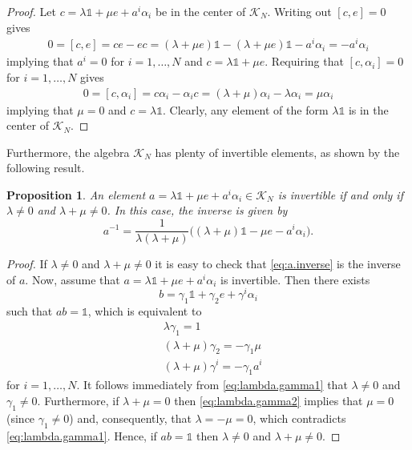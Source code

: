\documentclass{amsart}
\newcommand{\parab}[1]{\Big(#1\Big)}
\newtheorem{proposition}[theorem]{Proposition}
\theoremstyle{definition}
\theoremstyle{remark}
\numberwithin{equation}{section}
\newcommand{\K}{\mathcal{K}}
\renewcommand{\mid}{\mathds{1}}
\newcommand{\KN}{\K_N}
\begin{document}
\begin{proof}
  Let $c=\lambda\mid + \mu e + a^i\alpha_i$ be in the center of
  $\KN$. Writing out $[c,e] = 0$ gives
  \begin{align*}
    0=[c,e] = ce - ec = (\lambda+\mu e)\mid -(\lambda+\mu e)\mid-a^i\alpha_i
    =-a^i\alpha_i
  \end{align*}
  implying that $a^i=0$ for $i=1,\ldots,N$ and $c=\lambda\mid+\mu
  e$. Requiring that $[c,\alpha_i]=0$ for $i=1,\ldots,N$ gives
  \begin{align*}
    0 = [c,\alpha_i] = c\alpha_i-\alpha_ic
    = (\lambda+\mu)\alpha_i-\lambda\alpha_i = \mu\alpha_i
  \end{align*}
  implying that $\mu=0$ and $c=\lambda\mid$. Clearly, any element of
  the form $\lambda\mid$ is in the center of $\KN$.
\end{proof}

\noindent
Furthermore, the algebra $\KN$ has plenty of invertible elements, as shown by the
following result.

\begin{proposition}\label{prop:invertible}
  An element $a=\lambda\mid+\mu e+a^i\alpha_i\in\KN$ is invertible if
  and only if $\lambda\neq 0$ and $\lambda+\mu\neq 0$. In this case,
  the inverse is given by
  \begin{equation}\label{eq:a.inverse}
    a^{-1} = \frac{1}{\lambda(\lambda+\mu)}\parab{(\lambda+\mu)\mid -\mu e - a^i\alpha_i}.
  \end{equation}
\end{proposition}

\begin{proof}
  If $\lambda\neq 0$ and $\lambda+\mu\neq 0$ it is easy to check that
  \eqref{eq:a.inverse} is the inverse of $a$. Now, assume that
  $a=\lambda\mid+\mu e+a^i\alpha_i$ is invertible. Then there exists
  \begin{equation*}
    b = \gamma_1\mid + \gamma_2e + \gamma^i\alpha_i
  \end{equation*}
  such that $ab=\mid$, which is equivalent to
  \begin{align}
    &\lambda\gamma_1 = 1\label{eq:lambda.gamma1}\\
    &(\lambda+\mu)\gamma_2 = -\gamma_1\mu\label{eq:lambda.gamma2}\\
    &(\lambda+\mu)\gamma^i = -\gamma_1a^i\label{eq:lambda.gammai}
  \end{align}
  for $i=1,\ldots,N$. It follows immediately from
  \eqref{eq:lambda.gamma1} that $\lambda\neq 0$ and $\gamma_1\neq
  0$. Furthermore, if $\lambda+\mu=0$ then \eqref{eq:lambda.gamma2}
  implies that $\mu=0$ (since $\gamma_1\neq 0$) and, consequently,
  that $\lambda=-\mu=0$, which contradicts \eqref{eq:lambda.gamma1}.
  Hence, if $ab=\mid$ then $\lambda\neq 0$ and $\lambda+\mu\neq 0$.
\end{proof} 
\end{document}
